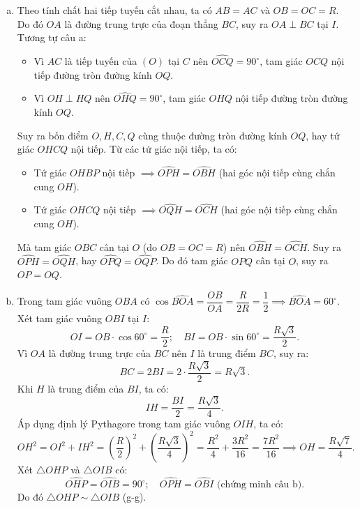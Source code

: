 \begin{bt}
{\begin{enumerate}[a)]
	Lại có $d \perp OH$ tại $H$ nên $\widehat{OHP} = 90^\circ$.
	Tam giác $OHP$ vuông tại $H$ nên nội tiếp đường tròn đường kính $OP$.
	Suy ra bốn điểm $O, H, B, P$ cùng thuộc đường tròn đường kính $OP$, hay tứ giác $OHBP$ nội tiếp.
	\item Theo tính chất hai tiếp tuyến cắt nhau, ta có $AB = AC$ và $OB = OC = R$.
	Do đó $OA$ là đường trung trực của đoạn thẳng $BC$, suy ra $OA \perp BC$ tại $I$.
	Tương tự câu a:
	\begin{itemize}
		\item Vì $AC$ là tiếp tuyến của $(O)$ tại $C$ nên $\widehat{OCQ} = 90^\circ$, tam giác $OCQ$ nội tiếp đường tròn đường kính $OQ$.
		\item Vì $OH \perp HQ$ nên $\widehat{OHQ} = 90^\circ$, tam giác $OHQ$ nội tiếp đường tròn đường kính $OQ$.
	\end{itemize}
	Suy ra bốn điểm $O, H, C, Q$ cùng thuộc đường tròn đường kính $OQ$, hay tứ giác $OHCQ$ nội tiếp.
	Từ các tứ giác nội tiếp, ta có:
	\begin{itemize}
		\item Tứ giác $OHBP$ nội tiếp $\implies \widehat{OPH} = \widehat{OBH}$ (hai góc nội tiếp cùng chắn cung $OH$).
		\item Tứ giác $OHCQ$ nội tiếp $\implies \widehat{OQH} = \widehat{OCH}$ (hai góc nội tiếp cùng chắn cung $OH$).
	\end{itemize}
	Mà tam giác $OBC$ cân tại $O$ (do $OB = OC = R$) nên $\widehat{OBH} = \widehat{OCH}$.
	Suy ra $\widehat{OPH} = \widehat{OQH}$, hay $\widehat{OPQ} = \widehat{OQP}$.
	Do đó tam giác $OPQ$ cân tại $O$, suy ra $OP = OQ$.
	\item Trong tam giác vuông $OBA$ có $\cos \widehat{BOA} = \dfrac{OB}{OA} = \dfrac{R}{2R} = \dfrac{1}{2} \implies \widehat{BOA} = 60^\circ$.
	Xét tam giác vuông $OBI$ tại $I$:
	$$OI = OB \cdot \cos 60^\circ = \dfrac{R}{2}; \quad BI = OB \cdot \sin 60^\circ = \dfrac{R\sqrt{3}}{2}.$$
	Vì $OA$ là đường trung trực của $BC$ nên $I$ là trung điểm $BC$, suy ra:
	$$BC = 2BI = 2 \cdot \dfrac{R\sqrt{3}}{2} = R\sqrt{3}.$$
	Khi $H$ là trung điểm của $BI$, ta có:
	$$IH = \dfrac{BI}{2} = \dfrac{R\sqrt{3}}{4}.$$
	Áp dụng định lý Pythagore trong tam giác vuông $OIH$, ta có:
	$$OH^2 = OI^2 + IH^2 = \left(\dfrac{R}{2}\right)^2 + \left(\dfrac{R\sqrt{3}}{4}\right)^2 = \dfrac{R^2}{4} + \dfrac{3R^2}{16} = \dfrac{7R^2}{16} \implies OH = \dfrac{R\sqrt{7}}{4}.$$
	Xét $\triangle OHP$ và $\triangle OIB$ có:
	$$\widehat{OHP} = \widehat{OIB} = 90^\circ; \quad \widehat{OPH} = \widehat{OBI}\text{ (chứng minh câu b)}.$$
	Do đó $\triangle OHP \sim \triangle OIB$ (g-g).

\end{enumerate}}
\end{bt}
